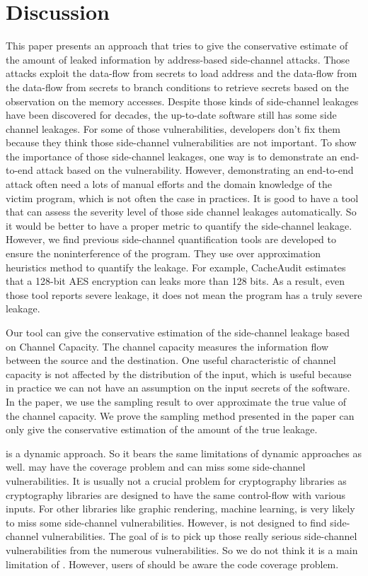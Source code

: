 \section{Discussion}

This paper presents an approach that tries to give the conservative estimate of the amount of leaked information by address-based side-channel attacks. Those attacks exploit the data-flow from secrets to load address and the data-flow from the data-flow from secrets to branch conditions to retrieve secrets based on the observation on the memory accesses. Despite those kinds of side-channel leakages have been discovered for decades, the up-to-date software still has some side channel leakages. For some of those vulnerabilities, developers don't fix them because they think those side-channel vulnerabilities are not important. To show the importance of those side-channel leakages, one way is to demonstrate an end-to-end attack based on the vulnerability. However, demonstrating an end-to-end attack often need a lots of manual efforts and the domain knowledge of the victim program, which is not often the case in practices. It is good to have a tool that can assess the severity level of those side channel leakages automatically. So it would be better to have a proper metric to quantify the side-channel leakage. However, we find previous side-channel quantification tools are developed to  ensure the noninterference of the program. They use over approximation heuristics method to quantify the leakage. For example, CacheAudit estimates that a 128-bit AES encryption can leaks more than 128 bits. As a result, even those tool reports severe leakage, it does not mean the program has a truly severe leakage.

Our tool can give the conservative estimation of the side-channel leakage based on Channel Capacity. The channel capacity measures  the information flow between the source and the destination. One useful characteristic of channel capacity is not affected by the distribution of the input, which is useful because in practice we can not have an assumption on the input secrets of the software. In the paper, we use the sampling result to over approximate the true value of the channel capacity. We prove the sampling method presented in the paper can only give the conservative estimation of the amount of the true leakage.

\ctool{} is a dynamic approach. So it bears the same limitations of dynamic approaches as well. \ctool{} may have the coverage problem and can miss some side-channel vulnerabilities. It is usually not a crucial problem for cryptography libraries as cryptography libraries are designed to have the same control-flow with various inputs. For other libraries like graphic rendering, machine learning, \ctool{} is very likely to miss some side-channel vulnerabilities. However, \ctool{} is not designed to find side-channel vulnerabilities. The goal of \ctool{} is to pick up those really serious side-channel vulnerabilities from the numerous vulnerabilities. So we do not think it is a main limitation of \ctool{}. However, users of \ctool{} should be aware the code coverage problem.

